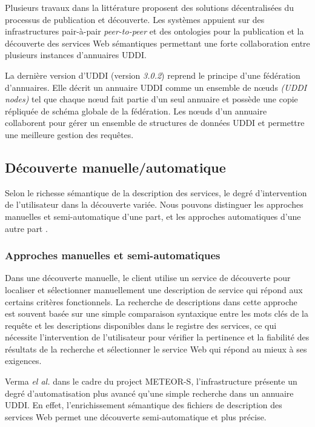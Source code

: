     Plusieurs travaux dans la littérature proposent des solutions
    décentralisées du processus de publication et découverte. Les
    systèmes \cite{paolucci2003using, schmidt2004peer,
      verma2005meteor} appuient sur des infrastructures pair-à-pair
    \textit{peer-to-peer} et des ontologies pour la publication et la
    découverte des services Web sémantiques permettant une forte
    collaboration entre plusieurs instances d'annuaires \textsc{UDDI}.

    La dernière version d'\textsc{UDDI} \cite{oasis2005specification}
    (version \textit{3.0.2}) reprend le principe d'une fédération
    d'annuaires. Elle décrit un annuaire \textsc{UDDI} comme un
    ensemble de nœuds \textit{(UDDI nodes)} tel que chaque nœud fait
    partie d'un seul annuaire et possède une copie répliquée de schéma
    globale de la fédération. Les nœuds d'un annuaire collaborent pour
    gérer un ensemble de structures de données \textsc{UDDI} et
    permettre une meilleure gestion des requêtes.

  \subsection{Découverte manuelle/automatique}
  \label{sec:ws-desc:manual-vs-auto}
  Selon le richesse sémantique de la description des services, le
  degré d'intervention de l'utilisateur dans la découverte
  variée. Nous pouvons distinguer les approches manuelles et
  semi-automatique d'une part, et les approches automatiques d'une
  autre part \cite{elie2010,garofalakis2004web}.

    \subsubsection{Approches manuelles et semi-automatiques}
    \label{ws-desc:manual}
    Dans une découverte manuelle, le client utilise un service de
    découverte pour localiser et sélectionner manuellement une
    description de service qui répond aux certains critères
    fonctionnels. La recherche de descriptions dans cette approche est
    souvent basée sur une simple comparaison syntaxique entre les mots
    clés de la requête et les descriptions disponibles dans le
    registre des services, ce qui nécessite l'intervention de
    l'utilisateur pour vérifier la pertinence et la fiabilité des
    résultats de la recherche et sélectionner le service Web qui
    répond au mieux à ses exigences.

    Verma \textit{el al.} \cite{verma2005meteor} dans le cadre du
    project \textsc{METEOR-S}, l'infrastructure présente un degré
    d'automatisation plus avancé qu'une simple recherche dans un
    annuaire \textsc{UDDI}. En effet, l'enrichissement sémantique des
    fichiers de description des services Web permet une découverte
    semi-automatique et plus précise.

